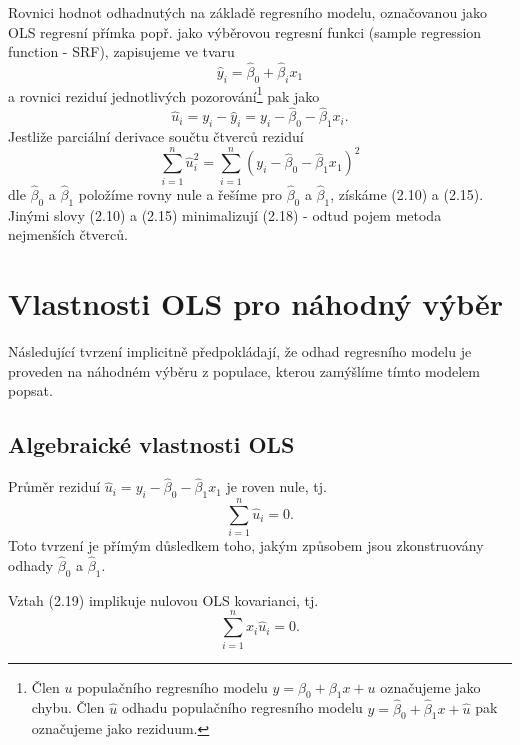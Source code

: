 Rovnici hodnot odhadnutých na základě regresního modelu, označovanou jako OLS regresní přímka popř. jako 
výběrovou regresní funkci (sample regression function - SRF), zapisujeme ve tvaru
\begin{equation}
\hat{y}_i = \hat{\beta}_0 + \hat{\beta}_ix_1
\end{equation}
a rovnici reziduí jednotlivých pozorování\footnote{Člen $u$ populačního regresního modelu $y = \beta_0 + 
\beta_1 x + u$ označujeme jako chybu. Člen $\hat{u}$ odhadu populačního regresního modelu $y = \hat{\beta}_0 + 
\hat{\beta}_1 x + \hat{u}$ pak označujeme jako reziduum.} pak jako
\begin{equation}
\hat{u}_i = y_i - \hat{y}_i = y_i - \hat{\beta}_0 - \hat{\beta}_1x_i.
\end{equation}
Jestliže parciální derivace součtu čtverců reziduí
\begin{equation}
\sum_{i = 1}^n \hat{u}_i^2 = \sum_{i = 1}^n (y_i - \hat{\beta}_0 - \hat{\beta}_1 x_1)^2
\end{equation}
dle $\hat{\beta}_0$ a $\hat{\beta}_1$ položíme rovny nule a řešíme pro $\hat{\beta}_0$ a $\hat{\beta}_1$, 
získáme (2.10) a (2.15). Jinými slovy (2.10) a (2.15) minimalizují (2.18) - odtud pojem metoda nejmenších čtverců.

\section{Vlastnosti OLS pro náhodný výběr}

Následující tvrzení implicitně předpokládají, že odhad regresního modelu je proveden na náhodném výběru z populace, kterou zamýšlíme 
tímto modelem popsat.

\subsection{Algebraické vlastnosti OLS}

Průměr reziduí $\hat{u}_i = y_i - \hat{\beta}_0 - \hat{\beta}_1x_1$ je roven nule, tj.
\begin{equation}
\sum_{i = 1}^n \hat{u}_i = 0.
\end{equation}
Toto tvrzení je přímým důsledkem toho, jakým způsobem jsou zkonstruovány odhady $\hat{\beta}_0$ a 
$\hat{\beta}_1$.

Vztah (2.19) implikuje nulovou OLS kovarianci, tj.
\begin{equation}
\sum_{i = 1}^n x_i \hat{u}_i = 0.
\end{equation}

